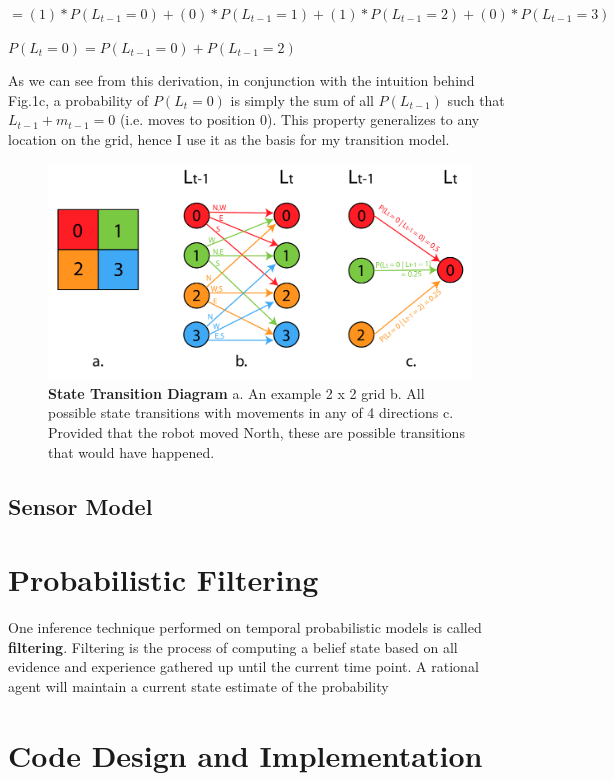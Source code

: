 \documentclass{article}
\begin{document}
\vspace{4mm}\hspace{17mm}$ = (1)*P(L_{t-1} = 0) + (0)*P(L_{t-1} = 1) + (1)*P(L_{t-1} = 2) + (0)*P(L_{t-1} = 3) $

\vspace{4mm}$P(L_t=0)=P(L_{t-1} = 0) + P(L_{t-1}=2)$

\vspace{5mm}

As we can see from this derivation, in conjunction with the intuition behind Fig.1c, a probability of $P(L_t = 0)$ is simply the sum of all $P(L_{t-1})$ such that $L_{t-1} + m_{t-1} = 0$ (i.e. moves to position 0). This property generalizes to any location on the grid, hence I use it as the basis for my transition model.

\vspace{5mm}

\begin{figure}[!htb]
\centering
\includegraphics[scale=0.4]{transitions.pdf}
\caption{{\bf State Transition Diagram} a. An example 2 x 2 grid \hspace{2mm} b. All possible state transitions with movements in any of 4 directions \hspace{2mm} c. Provided that the robot moved North, these are possible transitions that would have happened. }
\end{figure}

\subsection{Sensor Model}



\section{Probabilistic Filtering}

One inference technique performed on temporal probabilistic models is called {\bf filtering}. Filtering is the process of computing a belief state based on all evidence and experience gathered up until the current time point. A rational agent will maintain a current state estimate of the probability

\section{Code Design and Implementation}
\end{document}
